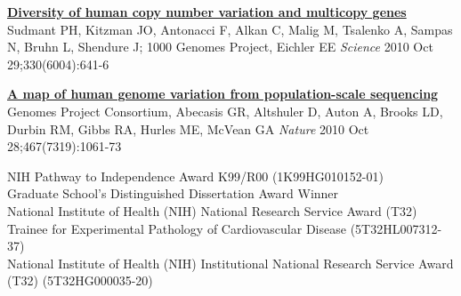 \documentclass[9pt]{article}
\begin{document}
\noindent\href{https://www.ncbi.nlm.nih.gov/pubmed/21030649}{\bf  Diversity of human copy number variation and multicopy genes}\vspace{-0.03in}
\newline\noindent Sudmant PH, Kitzman JO, Antonacci F, Alkan C, Malig M, Tsalenko A, Sampas N,  Bruhn L, Shendure J; 1000 Genomes Project, Eichler EE
\newline\noindent\emph{ Science} 2010 Oct 29;330(6004):641-6
\bigskip

\noindent\href{https://www.ncbi.nlm.nih.gov/pubmed/20981092}{\bf  A map of human genome variation from population-scale sequencing}\vspace{-0.03in}
\newline{} Genomes Project Consortium, Abecasis GR, Altshuler D, Auton A, Brooks LD, Durbin RM, Gibbs RA, Hurles ME, McVean GA
\newline\noindent\emph{ Nature} 2010 Oct 28;467(7319):1061-73
\bigskip

\medskip
{}
\noindent NIH Pathway to Independence Award K99/R00 (1K99HG010152-01) 
\\
\newline
\noindent Graduate School's Distinguished Dissertation Award Winner 
\\
\newline\noindent National Institute of Health (NIH) National Research Service Award (T32) Trainee for Experimental Pathology of Cardiovascular Disease (5T32HL007312-37) 
\\
\newline\noindent National Institute of Health (NIH) Institutional National Research Service Award (T32) (5T32HG000035-20) 
\bigskip

\medskip
{}
\end{document}
